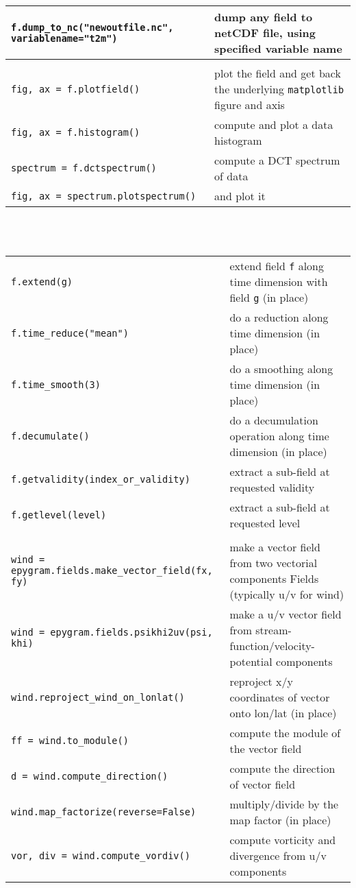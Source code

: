 \documentclass[a4paper,10pt]{article}
\begin{document}
\begin{tabular}{|p{9.5cm}|p{9.5cm}|}
\texttt{f.dump\_to\_nc("newoutfile.nc", variablename="t2m")} & dump any field to netCDF file, using specified variable name\\
\hline
\rowcolor{gray!50}
\multicolumn{2}{|c|}{\textbf{Fields data representation}}\\
\hline
\texttt{fig, ax = f.plotfield()} & plot the field and get back the underlying \texttt{matplotlib} figure and axis\\
\texttt{fig, ax = f.histogram()} & compute and plot a data histogram\\
\texttt{spectrum = f.dctspectrum()} & compute a DCT spectrum of data\\
\texttt{fig, ax = spectrum.plotspectrum()} & and plot it\\
\hline
\end{tabular}\\
\\

\begin{tabular}{|p{9.5cm}|p{9.5cm}|}
\hline
\rowcolor{gray!50}
\multicolumn{2}{|c|}{\textbf{n-D Fields}}\\
\hline
\texttt{f.extend(g)} & extend field \texttt{f} along time dimension with field \texttt{g} (in place)\\
\texttt{f.time\_reduce("mean")} & do a reduction along time dimension (in place)\\
\texttt{f.time\_smooth(3)} & do a smoothing along time dimension (in place)\\
\texttt{f.decumulate()} & do a decumulation operation along time dimension (in place)\\
\texttt{f.getvalidity(index\_or\_validity)} & extract a sub-field at requested validity\\
\texttt{f.getlevel(level)} & extract a sub-field at requested level\\
\hline
\rowcolor{gray!50}
\multicolumn{2}{|c|}{\textbf{Vector Fields}}\\
\hline
\texttt{wind = epygram.fields.make\_vector\_field(fx, fy)} & make a vector field from two vectorial components Fields (typically u/v for wind)\\
\texttt{wind = epygram.fields.psikhi2uv(psi, khi)} & make a u/v vector field from stream-function/velocity-potential components \footnotemark[1]\\
\texttt{wind.reproject\_wind\_on\_lonlat()} & reproject x/y coordinates of vector onto lon/lat (in place)\\
\texttt{ff = wind.to\_module()} & compute the module of the vector field\\
\texttt{d = wind.compute\_direction()} & compute the direction of vector
 field\\
\texttt{wind.map\_factorize(reverse=False)} & multiply/divide by the map factor (in place)\\
\texttt{vor, div = wind.compute\_vordiv()} & compute vorticity and divergence from u/v components \footnotemark[1]\\
\hline
\end{tabular}\\
\\
\end{document}
